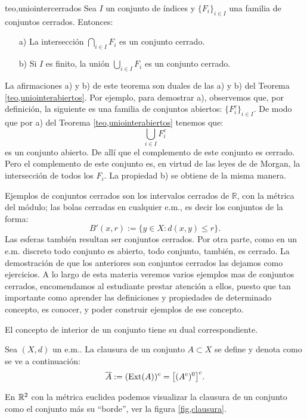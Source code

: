 \begin{teorema}{teo,uniointercerrados} Sea $I$ un conjunto de índices y
$\{F_i\}_{i\in I}$ una familia de conjuntos cerrados. Entonces:
\begin{itemize}
\item[a)] La intersección $\bigcap_{i\in I}F_i$ es un conjunto cerrado.
\item[b)] Si $I$ es finito, la unión $\bigcup_{i\in
I}F_i$ es un conjunto cerrado.
\end{itemize}
\end{teorema}
\begin{demo} La afirmaciones a) y b) de este teorema son duales de
las a) y b) del Teorema \vref{teo,uniointerabiertos}. Por ejemplo,
para demostrar a), observemos que, por definición, la siguiente
es una familia de conjuntos abiertos: $\{F_i^c\}_{i\in I}$. De
modo que por a) del Teorema \vref{teo,uniointerabiertos} tenemos
que:
\[\bigcup\limits_{i\in I}F_i^c\]
es un conjunto abierto. De allí que el complemento de este
conjunto es cerrado. Pero el complemento de este conjunto es, en
virtud de las leyes de de Morgan, la intersección de todos los
$F_i$. La propiedad b) se obtiene de la misma manera.
\end{demo}

Ejemplos de conjuntos cerrados son los intervalos cerrados de
$\mathbb{R}$, con la métrica del módulo; las bolas cerradas en
cualquier e.m., es decir los conjuntos de la forma:
\[B'(x,r):=\{y\in X: d(x,y)\leq r\}.\]
Las esferas también resultan ser conjuntos cerrados. Por otra
parte, como en un e.m. discreto todo conjunto es abierto, todo
conjunto, también, es cerrado. La demostración de que los
anteriores son conjuntos cerrados las dejamos como ejercicios. A
lo largo de esta materia veremos varios ejemplos mas de conjuntos
cerrados, encomendamos al estudiante prestar atención a ellos,
puesto que tan importante como aprender las definiciones y
propiedades de determinado concepto, es conocer, y poder construir
ejemplos de ese concepto.

El concepto de interior de un conjunto tiene su dual
correspondiente.
\begin{definicion}{} Sea $(X,d)$ un e.m.. La clausura de un conjunto $A\subset
X$ se define y denota como se ve a continuación:
\[\overline{A}:=(\text{Ext}(A))^c=\bigl[(A^c)^0\bigr]^c.\]
\end{definicion}

 En $\mathbb{R}^2$ con la métrica euclidea podemos visualizar la
clausura de un conjunto  como el conjunto más su ``borde'', ver
la figura \vref{fig,clausura}.

